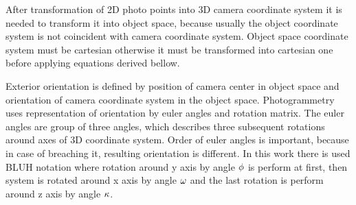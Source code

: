 \documentclass[a4paper,12pt]{article}
\newcommand{\escal}[1]{
{\it #1}
}
\begin{document}
After transformation of 2D photo points into 3D camera coordinate system it is needed to transform it into object space,
because usually the object coordinate system is not coincident with camera coordinate system. 
Object space coordinate system must be cartesian otherwise it must be transformed into cartesian one before applying equations 
derived bellow. 

Exterior orientation is defined by position of camera center in object space and orientation of camera coordinate system in the object space.
Photogrammetry uses representation of orientation by euler angles and rotation matrix.
The euler angles are group of three angles, which describes three subsequent rotations
 around axes of 3D coordinate system. 
 Order of euler angles is important, because in case of breaching it, resulting orientation is different. 
 In this work there is used BLUH notation \cite{baumker2001new} where rotation around y axis by angle $\escal{\phi}$ is 
 perform at first, then system is rotated around x axis  by angle $\escal{\omega}$ and
 the last rotation is perform around z axis by angle $\escal{\kappa}$.
 
\end{document}
